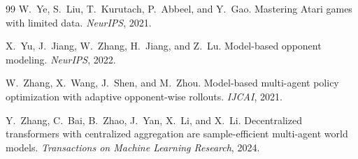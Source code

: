 \documentclass[11pt]{article}
\begin{document}
\begin{thebibliography}{99}
 W.~Ye, S.~Liu, T.~Kurutach, P.~Abbeel, and Y.~Gao. Mastering
Atari games with limited data. \emph{NeurIPS}, 2021.

 X.~Yu, J.~Jiang, W.~Zhang, H.~Jiang, and Z.~Lu. Model-based
opponent modeling. \emph{NeurIPS}, 2022.

 W.~Zhang, X.~Wang, J.~Shen, and M.~Zhou. Model-based
multi-agent policy optimization with adaptive opponent-wise rollouts. \emph{IJCAI},
2021.

 Y.~Zhang, C.~Bai, B.~Zhao, J.~Yan, X.~Li, and X.~Li.
Decentralized transformers with centralized aggregation are sample-efficient
multi-agent world models. \emph{Transactions on Machine Learning Research}, 2024.

\end{thebibliography}
\end{document}
